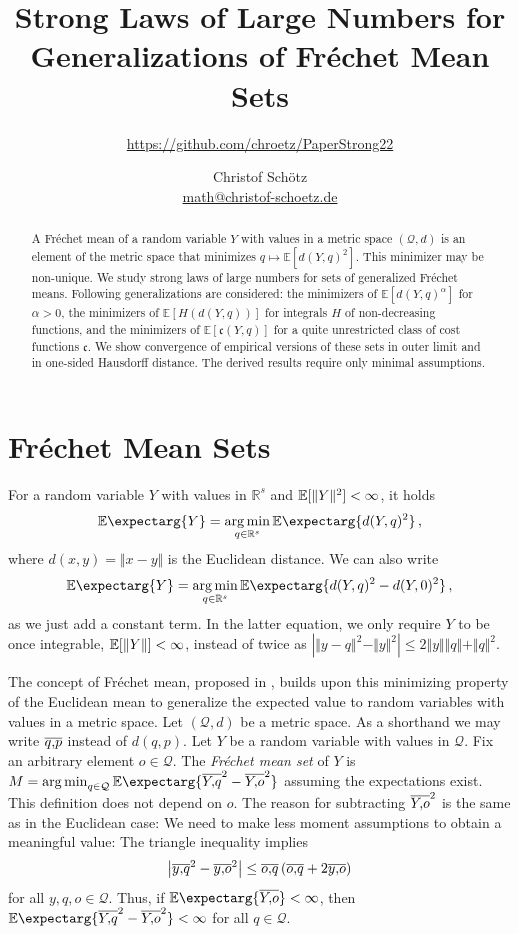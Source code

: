 \documentclass{scrartcl}
\newcommand{\Eof}[1]{\E[#1]}
\newcommand{\Ex}{\E\expectarg}
\newcommand*{\mc}[1]{\mathcal{#1}}
\newcommand*{\mf}[1]{\mathfrak{#1}}
\newcommand{\R}{\mathbb{R}}
\newcommand{\normof}[1]{\Vert #1 \Vert}
\newcommand{\equationComma}{\, ,}
\newcommand{\eqcm}{\equationComma}
\DeclareMathOperator*{\argmin}{arg\,min}
\theoremstyle{plain}\newtheorem{theorem}{Theorem}[section]
\theoremstyle{definition}
\theoremstyle{remark}
\begin{document}
\title{Strong Laws of Large Numbers for Generalizations of Fréchet Mean Sets}
\subtitle{\url{https://github.com/chroetz/PaperStrong22}}
\author{Christof Schötz\\\href{mailto:math@christof-schoetz.de}{math@christof-schoetz.de}}
\date{}
\maketitle
\begin{abstract} 
A Fréchet mean of a random variable $Y$ with values in a metric space $(\mathcal Q, d)$ is an element of the metric space that minimizes $q \mapsto \mathbb E[d(Y,q)^2]$. This minimizer may be non-unique. 
We study strong laws of large numbers for sets of generalized Fréchet means.
Following generalizations are considered: 
the minimizers of $\mathbb E[d(Y, q)^\alpha]$ for $\alpha > 0$,
the minimizers of $\mathbb E[H(d(Y, q))]$ for integrals $H$ of non-decreasing functions, and
the minimizers of $\mathbb E[\mathfrak c(Y, q)]$ for a quite unrestricted class of cost functions $\mf c$.
We show convergence of empirical versions of these sets in outer limit and in one-sided Hausdorff distance. The derived results require only minimal assumptions.
 \end{abstract}
\section{Fréchet Mean Sets}
For a random variable $Y$ with values in $\R^s$ and $\Eof{\normof{Y}^2}<\infty$, it holds
\begin{equation*}
	\Ex{Y} = \argmin_{q\in\R^s} \Ex{d(Y,q)^2}
	\eqcm
\end{equation*}
where $d(x,y) = \normof{x-y}$ is the Euclidean distance. We can also write 
\begin{equation*}
	\Ex{Y} = \argmin_{q\in\R^s} \Ex{d(Y,q)^2-d(Y,0)^2}
	\eqcm
\end{equation*}
as we just add a constant term. In the latter equation, we only require $Y$ to be once integrable, $\Eof{\normof{Y}}<\infty$, instead of twice as $|\normof{y-q}^2-\normof{y}^2| \leq 2\normof{y}\normof{q}+\normof{q}^2$.

The concept of Fréchet mean, proposed in \cite{frechet48}, builds upon this minimizing property of the Euclidean mean to generalize the expected value to random variables with values in a metric space. Let $(\mc Q, d)$ be a metric space. As a shorthand we may write $\overline{q,\!p}$ instead of $d(q,p)$. Let $Y$ be a random variable with values in $\mc Q$. Fix an arbitrary element $o\in \mc Q$. The \emph{Fréchet mean set} of $Y$ is $M = \argmin_{q\in\mc Q} \Ex{\ol Yq^2- \ol Yo^2}$ assuming the expectations exist. 
This definition does not depend on $o$. The reason for subtracting $\overline{Y,\!o}^2$ is the same as in the Euclidean case: We need to make less moment assumptions to obtain a meaningful value: The triangle inequality implies
\begin{equation*}
\left| \overline{y,\!q}^2 - \overline{y,\!o}^2 \right| \leq \overline{o,\!q} \left( \overline{o,\!q} + 2 \overline{y,\!o} \right)
\end{equation*}
for all $y,q,o\in\mc Q$. Thus, if $\Ex{\ol Yo} < \infty$, then $\Ex{\ol Yq^2 - \ol Yo^2} < \infty$ for all $q\in\mc Q$.
\end{document}
